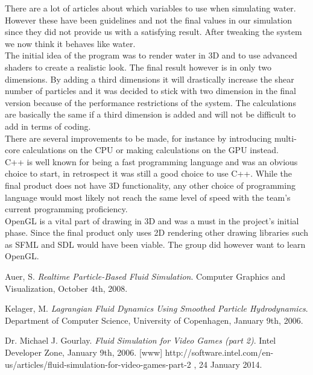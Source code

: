 \documentclass[a4paper,12pt,twoside,final]{report}
\begin{document}
\noindent There are a lot of articles about which variables to use when simulating water. However these have been guidelines and not the final values in our simulation since they did not provide us with a satisfying result. After tweaking the system we now think it behaves like water. \\

\noindent The initial idea of the program was to render water in 3D and to use advanced shaders to create a realistic look. The final result however is in only two dimensions. By adding a third dimensions it will drastically increase the shear number of particles and it was decided to stick with two dimension in the final version because of the performance restrictions of the system. The calculations are basically the same if a third dimension is added and will not be difficult to add in terms of coding. \\

\noindent There are several improvements to be made, for instance by introducing multi-core calculations on the CPU or making calculations on the GPU instead. \\

\noindent C++ is well known for being a fast programming language and was an obvious choice to start, in retrospect it was still a good choice to use C++. While the final product does not have 3D functionality, any other choice of programming language would most likely not reach the same level of speed with the team’s current programming proficiency. \\

\noindent OpenGL is a vital part of drawing in 3D and was a must in the project’s initial phase. Since the final product only uses 2D rendering other drawing libraries such as SFML and SDL would have been viable. The group did however want to learn OpenGL.









\begin{thebibliography}{11}

  Auer, S.
  \emph{Realtime Particle-Based Fluid Simulation}.
  Computer Graphics and Visualization,
  October 4th,
  2008.
  
  Kelager, M.
  \emph{Lagrangian Fluid Dynamics Using Smoothed Particle Hydrodynamics}.
  Department of Computer Science, University of Copenhagen,
  January 9th,
  2006.
  
    Dr. Michael J. Gourlay.
  \emph{Fluid Simulation for Video Games (part 2)}.
  Intel Developer Zone,
  January 9th,
  2006.
  [www] http://software.intel.com/en-us/articles/fluid-simulation-for-video-games-part-2 , 24 January 2014.
  
\end{thebibliography}
\end{document}
